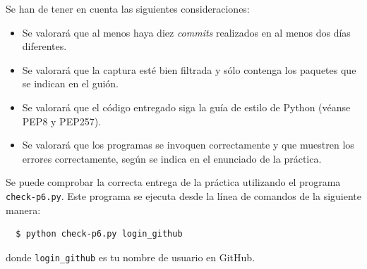 \documentclass[a4paper,11pt]{article}
\begin{document}
Se han de tener en cuenta las siguientes consideraciones:
\begin{itemize}
  \item Se valorará que al menos haya diez \emph{commits} realizados en al menos dos días diferentes.
  \item Se valorará que la captura esté bien filtrada y sólo contenga los paquetes que se indican en el guión.
  \item Se valorará que el código entregado siga la guía de estilo de Python (véanse PEP8 y PEP257).
  \item Se valorará que los programas se invoquen correctamente y que muestren los errores correctamente, según se indica en el enunciado de la práctica.
\end{itemize}

Se puede comprobar la correcta entrega de la práctica utilizando el programa \texttt{check-p6.py}. Este programa se ejecuta desde la línea de comandos de la siguiente manera:
\begin{verbatim}
  $ python check-p6.py login_github
\end{verbatim}


donde \texttt{login\_github} es tu nombre de usuario en GitHub.



%
%
\end{document}

